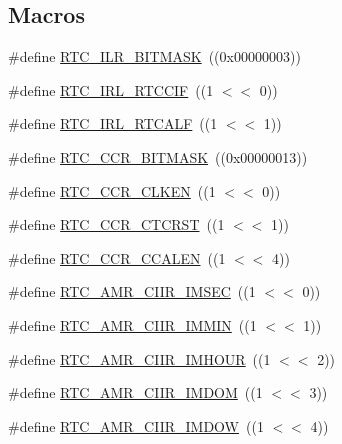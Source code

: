\subsection*{Macros}
\begin{DoxyCompactItemize}
\item 
\#define \hyperlink{group__RTC__17XX__40XX_ga9c00baff0fca4f8e747fadfe9ee12775}{R\-T\-C\-\_\-\-I\-L\-R\-\_\-\-B\-I\-T\-M\-A\-S\-K}~((0x00000003))
\item 
\#define \hyperlink{group__RTC__17XX__40XX_gaf706fff68e830a082d476467fe71f297}{R\-T\-C\-\_\-\-I\-R\-L\-\_\-\-R\-T\-C\-C\-I\-F}~((1 $<$$<$ 0))
\item 
\#define \hyperlink{group__RTC__17XX__40XX_ga237351d2c7f08b447254eff9578eb11e}{R\-T\-C\-\_\-\-I\-R\-L\-\_\-\-R\-T\-C\-A\-L\-F}~((1 $<$$<$ 1))
\item 
\#define \hyperlink{group__RTC__17XX__40XX_gadc461b6f544d66841e09499b2b9734c7}{R\-T\-C\-\_\-\-C\-C\-R\-\_\-\-B\-I\-T\-M\-A\-S\-K}~((0x00000013))
\item 
\#define \hyperlink{group__RTC__17XX__40XX_gad08af035635f5acd7931cb982f95e771}{R\-T\-C\-\_\-\-C\-C\-R\-\_\-\-C\-L\-K\-E\-N}~((1 $<$$<$ 0))
\item 
\#define \hyperlink{group__RTC__17XX__40XX_ga70900054432c82dad7d63d4598502923}{R\-T\-C\-\_\-\-C\-C\-R\-\_\-\-C\-T\-C\-R\-S\-T}~((1 $<$$<$ 1))
\item 
\#define \hyperlink{group__RTC__17XX__40XX_gaeb77b2340d896fae77ea670bb70e972e}{R\-T\-C\-\_\-\-C\-C\-R\-\_\-\-C\-C\-A\-L\-E\-N}~((1 $<$$<$ 4))
\item 
\#define \hyperlink{group__RTC__17XX__40XX_ga30c785b6017020d4c0b61b22aff30aac}{R\-T\-C\-\_\-\-A\-M\-R\-\_\-\-C\-I\-I\-R\-\_\-\-I\-M\-S\-E\-C}~((1 $<$$<$ 0))
\item 
\#define \hyperlink{group__RTC__17XX__40XX_ga3d67e7c72ec7bcd0831628841496cbc6}{R\-T\-C\-\_\-\-A\-M\-R\-\_\-\-C\-I\-I\-R\-\_\-\-I\-M\-M\-I\-N}~((1 $<$$<$ 1))
\item 
\#define \hyperlink{group__RTC__17XX__40XX_ga4e20983ef05abf10773186d3193270f9}{R\-T\-C\-\_\-\-A\-M\-R\-\_\-\-C\-I\-I\-R\-\_\-\-I\-M\-H\-O\-U\-R}~((1 $<$$<$ 2))
\item 
\#define \hyperlink{group__RTC__17XX__40XX_gacd23cffe1367b6bb612fb37ebdf2e279}{R\-T\-C\-\_\-\-A\-M\-R\-\_\-\-C\-I\-I\-R\-\_\-\-I\-M\-D\-O\-M}~((1 $<$$<$ 3))
\item 
\#define \hyperlink{group__RTC__17XX__40XX_ga6494d5878d87398a4519e90a367bffe5}{R\-T\-C\-\_\-\-A\-M\-R\-\_\-\-C\-I\-I\-R\-\_\-\-I\-M\-D\-O\-W}~((1 $<$$<$ 4))
\item 

\end{DoxyCompactItemize}
